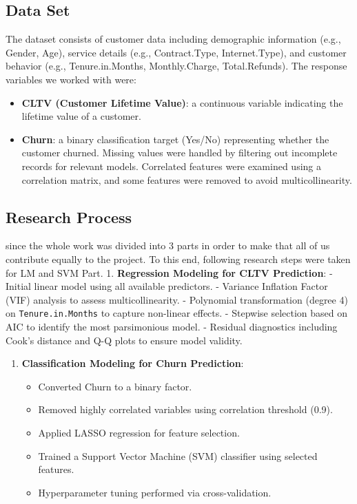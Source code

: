 \documentclass[
]{article}
\providecommand{\tightlist}{%
  \setlength{\itemsep}{0pt}\setlength{\parskip}{0pt}}
\begin{document}
\hypertarget{data-set}{%
\subsection{Data Set}\label{data-set}}

The dataset consists of customer data including demographic information
(e.g., Gender, Age), service details (e.g., Contract.Type,
Internet.Type), and customer behavior (e.g., Tenure.in.Months,
Monthly.Charge, Total.Refunds). The response variables we worked with
were:

\begin{itemize}
\tightlist
\item
  \textbf{CLTV (Customer Lifetime Value)}: a continuous variable
  indicating the lifetime value of a customer.
\item
  \textbf{Churn}: a binary classification target (Yes/No) representing
  whether the customer churned. Missing values were handled by filtering
  out incomplete records for relevant models. Correlated features were
  examined using a correlation matrix, and some features were removed to
  avoid multicollinearity.
\end{itemize}

\hypertarget{research-process}{%
\subsection{Research Process}\label{research-process}}

since the whole work was divided into 3 parts in order to make that all
of us contribute equally to the project. To this end, following research
steps were taken for LM and SVM Part. 1. \textbf{Regression Modeling for
CLTV Prediction}: - Initial linear model using all available predictors.
- Variance Inflation Factor (VIF) analysis to assess multicollinearity.
- Polynomial transformation (degree 4) on \texttt{Tenure.in.Months} to
capture non-linear effects. - Stepwise selection based on AIC to
identify the most parsimonious model. - Residual diagnostics including
Cook's distance and Q-Q plots to ensure model validity.

\begin{enumerate}
\def\labelenumi{\arabic{enumi}.}
\setcounter{enumi}{1}
\tightlist
\item
  \textbf{Classification Modeling for Churn Prediction}:

  \begin{itemize}
  \tightlist
  \item
    Converted Churn to a binary factor.
  \item
    Removed highly correlated variables using correlation threshold
    (0.9).
  \item
    Applied LASSO regression for feature selection.
  \item
    Trained a Support Vector Machine (SVM) classifier using selected
    features.
  \item
    Hyperparameter tuning performed via cross-validation.
  \end{itemize}
\end{enumerate}
\end{document}
